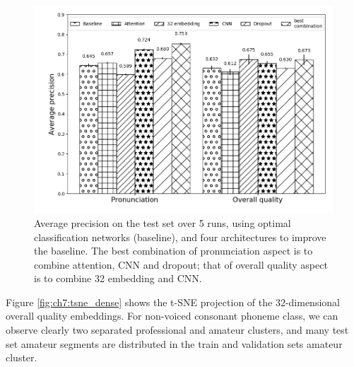\begin{figure}[ht!]
    \centering
    \includegraphics[width=\textwidth]{figs/ch7/improved_test_results_dlfm.png}
    \caption{Average precision on the test set over 5 runs, using optimal classification networks (baseline), and four architectures to improve the baseline. The best combination of pronunciation aspect is to combine attention, CNN and dropout; that of overall quality aspect is to combine 32 embedding and CNN.}
    \label{fig:ch7:improved_test}
\end{figure}

Figure \ref{fig:ch7:tsne_dense} shows the t-SNE projection of the 32-dimensional overall quality embeddings. For non-voiced consonant phoneme class, we can observe clearly two separated professional and amateur clusters, and many test set amateur segments are distributed in the train and validation sets amateur cluster. 

